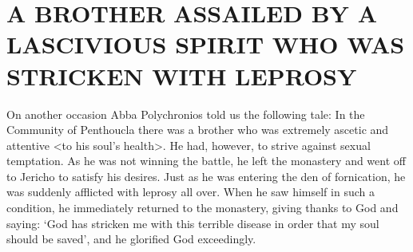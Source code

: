 \chapter{A BROTHER ASSAILED BY A LASCIVIOUS SPIRIT WHO WAS STRICKEN WITH LEPROSY}

On another occasion Abba Polychronios told us the following tale: In the Community of Penthoucla there was a brother who was extremely ascetic and attentive <to his soul's health>.
He had, however, to strive against sexual temptation.
As he was not winning the battle, he left the monastery and went off to Jericho to satisfy his desires.
Just as he was entering the den of fornication, he was suddenly afflicted with leprosy all over.
When he saw himself in such a condition, he immediately returned to the monastery, giving thanks to God and saying: `God has stricken me with this terrible disease in order that my soul should be saved', and he glorified God exceedingly.

